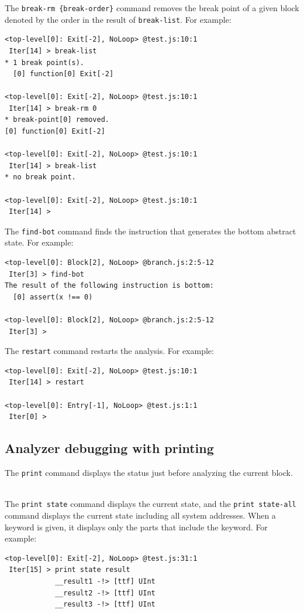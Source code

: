 \medskip
The \verb!break-rm {break-order}! command
removes the break point of a given block
denoted by the order in the result of \verb!break-list!.
For example:
{\small
\begin{verbatim}
<top-level[0]: Exit[-2], NoLoop> @test.js:10:1
 Iter[14] > break-list
* 1 break point(s).
  [0] function[0] Exit[-2]

<top-level[0]: Exit[-2], NoLoop> @test.js:10:1
 Iter[14] > break-rm 0
* break-point[0] removed.
[0] function[0] Exit[-2]

<top-level[0]: Exit[-2], NoLoop> @test.js:10:1
 Iter[14] > break-list
* no break point.

<top-level[0]: Exit[-2], NoLoop> @test.js:10:1
 Iter[14] >
\end{verbatim}
}

\medskip
The \verb!find-bot! command finds the instruction
that generates the bottom abstract state.  For example:
{\small
\begin{verbatim}
<top-level[0]: Block[2], NoLoop> @branch.js:2:5-12
 Iter[3] > find-bot
The result of the following instruction is bottom:
  [0] assert(x !== 0)

<top-level[0]: Block[2], NoLoop> @branch.js:2:5-12
 Iter[3] >
\end{verbatim}
}

\medskip
The \verb!restart! command restarts the analysis.  For example:
{\small
\begin{verbatim}
<top-level[0]: Exit[-2], NoLoop> @test.js:10:1
 Iter[14] > restart

<top-level[0]: Entry[-1], NoLoop> @test.js:1:1
 Iter[0] >
\end{verbatim}
}

\subsection{Analyzer debugging with printing}
\label{s:3:2:1:refman}
The \verb!print! command displays the status just before
analyzing the current block.

\medskip\noindent
{}\\[.2em]
The \verb!print state! command displays the current state,
and the \verb!print state-all! command
displays the current state including all system addresses.
When a keyword is given, it displays only the parts that include the keyword.
For example:
{\small
\begin{verbatim}
<top-level[0]: Exit[-2], NoLoop> @test.js:31:1
 Iter[15] > print state result
            __result1 -!> [ttf] UInt
            __result2 -!> [ttf] UInt
            __result3 -!> [ttf] UInt
\end{verbatim}
}

